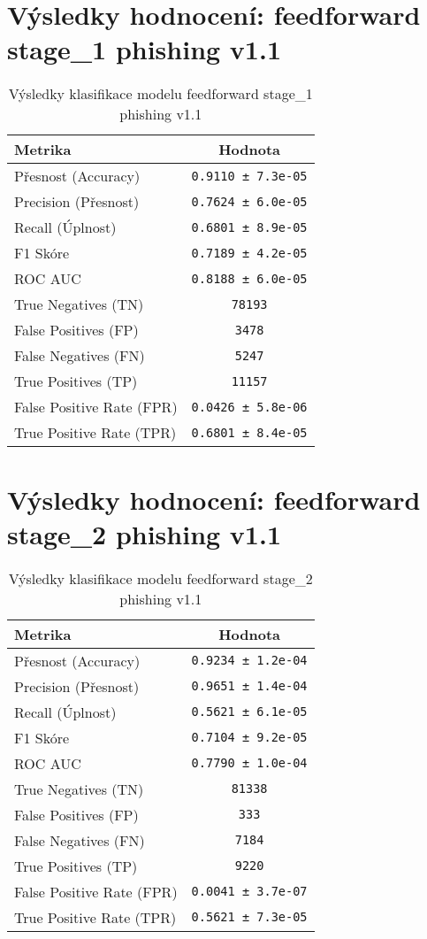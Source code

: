 \section*{Výsledky hodnocení: feedforward stage_1 phishing v1.1}
\begin{table}[h!]
\centering
\begin{tabular}{|l|c|}
\hline
\textbf{Metrika} & \textbf{Hodnota} \\
\hline
Přesnost (Accuracy) & \texttt{0.9110 ± 7.3e-05} \\
Precision (Přesnost) & \texttt{0.7624 ± 6.0e-05} \\
Recall (Úplnost) & \texttt{0.6801 ± 8.9e-05} \\
F1 Skóre & \texttt{0.7189 ± 4.2e-05} \\
ROC AUC & \texttt{0.8188 ± 6.0e-05} \\
True Negatives (TN) & \texttt{78193} \\
False Positives (FP) & \texttt{3478} \\
False Negatives (FN) & \texttt{5247} \\
True Positives (TP) & \texttt{11157} \\
False Positive Rate (FPR) & \texttt{0.0426 ± 5.8e-06} \\
True Positive Rate (TPR) & \texttt{0.6801 ± 8.4e-05} \\
\hline
\end{tabular}
\caption{Výsledky klasifikace modelu feedforward stage_1 phishing v1.1}
\label{tab:phishing_feedforward}
\end{table}

\section*{Výsledky hodnocení: feedforward stage_2 phishing v1.1}
\begin{table}[h!]
\centering
\begin{tabular}{|l|c|}
\hline
\textbf{Metrika} & \textbf{Hodnota} \\
\hline
Přesnost (Accuracy) & \texttt{0.9234 ± 1.2e-04} \\
Precision (Přesnost) & \texttt{0.9651 ± 1.4e-04} \\
Recall (Úplnost) & \texttt{0.5621 ± 6.1e-05} \\
F1 Skóre & \texttt{0.7104 ± 9.2e-05} \\
ROC AUC & \texttt{0.7790 ± 1.0e-04} \\
True Negatives (TN) & \texttt{81338} \\
False Positives (FP) & \texttt{333} \\
False Negatives (FN) & \texttt{7184} \\
True Positives (TP) & \texttt{9220} \\
False Positive Rate (FPR) & \texttt{0.0041 ± 3.7e-07} \\
True Positive Rate (TPR) & \texttt{0.5621 ± 7.3e-05} \\
\hline
\end{tabular}
\caption{Výsledky klasifikace modelu feedforward stage_2 phishing v1.1}
\label{tab:phishing_feedforward}
\end{table}

